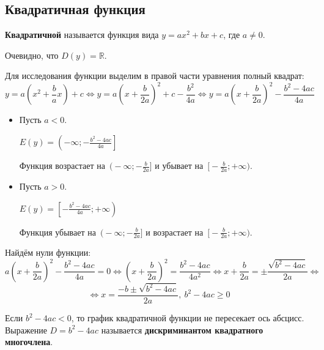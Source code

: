 \subsection{Квадратичная функция}
 \textbf{Квадратичной} называется функция вида $y = ax^2 + bx + c$, где $a \neq 0$.

Очевидно, что $D(y) = \mathbb R$.

Для исследования функции выделим в правой части уравнения полный квадрат:
\begin{equation*}
y = a \left( x^2 + \frac{b}a x \right) + c \Leftrightarrow
y = a \left( x + \frac{b}{2a} \right)^2 + c - \frac{b^2}{4a} \Leftrightarrow
y = a \left( x + \frac{b}{2a} \right)^2 - \frac{b^2 - 4ac}{4a}
\end{equation*}
\begin{itemize}
	\item Пусть $a < 0$.
	
	$\displaystyle E(y) = \left( -\infty; -\frac{b^2 - 4ac}{4a} \right]$
	
	Функция возрастает на~$\bigl( -\infty; -\frac{b}{2a} \bigr]$ и убывает на~$\bigl[ -\frac{b}{2a}; +\infty \bigr)$.
	
	\item Пусть $a > 0$.
	
	$\displaystyle E(y) = \left[ -\frac{b^2 - 4ac}{4a}; +\infty \right)$
	
	Функция убывает на~$\bigl( -\infty; -\frac{b}{2a} \bigr]$ и возрастает на~$\bigl[ -\frac{b}{2a}; +\infty \bigr)$.
\end{itemize}

Найдём нули функции:
\begin{equation*}
a \left( x + \frac{b}{2a} \right)^2 - \frac{b^2 - 4ac}{4a} = 0 \Leftrightarrow
\left( x + \frac{b}{2a} \right)^2 = \frac{b^2 - 4ac}{4a^2} \Leftrightarrow
x + \frac{b}{2a} = \pm\frac{\sqrt{b^2 - 4ac}}{2a} \Leftrightarrow
\end{equation*}
\begin{equation*}
\Leftrightarrow x = \frac{-b \pm \sqrt{b^2 - 4ac}}{2a}, \ b^2 - 4ac \geqslant 0
\end{equation*}

Если $b^2 - 4ac < 0$, то график квадратичной функции не пересекает ось абсцисс.
 Выражение $D = b^2 - 4ac$ называется \textbf{дискриминантом квадратного многочлена}.

